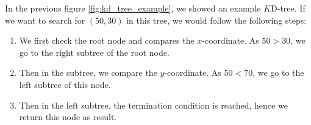 \begin{mscexample}    
	In the previous figure \ref{fig:kd_tree_example}, we showed an example $K$D-tree. If we want to search for $(50, 30)$ in this tree, we would follow the following steps:
	\begin{enumerate}
		\item We first check the root node and compares the $x$-coordinate. As $50>30$, we go to the right subtree of the root node.
		\item Then in the subtree, we compare the $y$-coordinate. As $50<70$, we go to the left subtree of this node.
		\item Then in the left subtree, the termination condition is reached, hence we return this node as result.
	\end{enumerate}
\end{mscexample}
